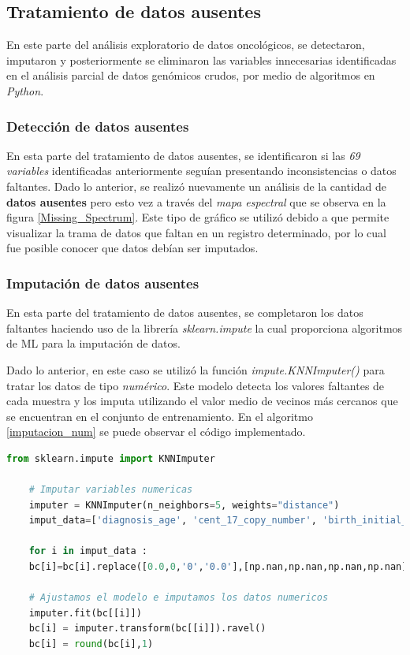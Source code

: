 \newpage
\subsection{Tratamiento de datos ausentes}
En este parte del análisis exploratorio de datos oncológicos, se detectaron, imputaron y posteriormente se eliminaron las variables innecesarias identificadas en el análisis parcial de datos genómicos crudos, por medio de algoritmos en \textit{Python}.

\subsubsection{Detección de datos ausentes}
En esta parte del tratamiento de datos ausentes, se identificaron si las \textit{69 variables} identificadas anteriormente seguían presentando inconsistencias o datos faltantes. Dado lo anterior, se realizó nuevamente un análisis de la cantidad de \textbf{datos ausentes} pero esto vez a través del \textit{mapa espectral} que se observa en la figura \ref{Missing_Spectrum}. Este tipo de gráfico se utilizó debido a que permite visualizar la trama de datos que faltan en un registro determinado, por lo cual fue posible conocer que datos debían ser imputados.

\subsubsection{Imputación de datos ausentes}
En esta parte del tratamiento de datos ausentes, se completaron los datos faltantes haciendo uso de la librería \textit{sklearn.impute} la cual proporciona algoritmos de ML para la imputación de datos. 

Dado lo anterior, en este caso se utilizó la función \textit{impute.KNNImputer()} para tratar los datos de tipo \textit{numérico}. Este modelo detecta los valores faltantes de cada muestra y los imputa utilizando el valor medio de vecinos más cercanos que se encuentran en el conjunto de entrenamiento. En el algoritmo \ref{imputacion_num} se puede observar el código implementado.

\begin{lstlisting}[basicstyle=\scriptsize,language=Python, label=imputacion_num, caption=Imputar datos numéricos con sklearn en Python.]
	from sklearn.impute import KNNImputer
	
	# Imputar variables numericas
	imputer = KNNImputer(n_neighbors=5, weights="distance")
	imput_data=['diagnosis_age', 'cent_17_copy_number', 'birth_initial_diagnosis', 'days_sample_collection', 'her_2_cent_17_ratio', 'disease_free_months', 'days_last_followup', 'year_initial_diagnosis', 'positive_lymph_hematoxylin', 'lymph_examined_number', 'mutation_count', 'overall_survival_months', 'tmb_nonsynonymous' ]
	
	for i in imput_data :
	bc[i]=bc[i].replace([0.0,0,'0','0.0'],[np.nan,np.nan,np.nan,np.nan])
	
	# Ajustamos el modelo e imputamos los datos numericos
	imputer.fit(bc[[i]])
	bc[i] = imputer.transform(bc[[i]]).ravel()
	bc[i] = round(bc[i],1)
\end{lstlisting}

